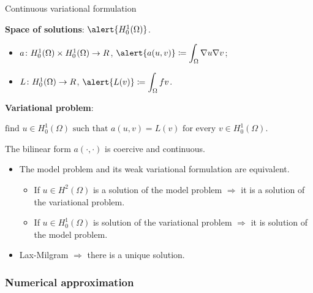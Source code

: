 \begin{frame}[allowframebreaks]{Continuous variational formulation}

\textbf{Space of solutions}: $\alert{H_0^1(\Omega)}$.
\begin{itemize}\itemsep1em
	\item $a\colon H^1_0(\Omega)\times H_0^1(\Omega)\to\relax R$, $\displaystyle \alert{a(u,v)}\coloneqq\int_\Omega\nabla u\nabla v$;
	\item $L\colon H_0^1(\Omega)\to\relax R$, $\displaystyle \alert{L(v)}\coloneqq\int_\Omega f v$.
\end{itemize}
\textbf{Variational problem}:
\begin{block}{}
	\begin{center}
	$\text{find } u\in H^1_0(\Omega) \text{ such that } a(u,v)=L(v)\text{ for every } v\in H_0^1(\Omega)$.
	\end{center}
\end{block}
\framebreak
\begin{theorem}
	The bilinear form $a(\cdot,\cdot)$ is coercive and continuous.
\end{theorem}

\begin{itemize}\itemsep1em
	\item The model problem and its weak variational formulation are \alert{equivalent}.
	\begin{itemize}\itemsep1em
		\item If $u\in H^2(\Omega)$ is a solution of the model problem $\Rightarrow$ it is a solution of the variational problem.
		\item If $u\in H_0^1(\Omega)$ is solution of the variational problem $\Rightarrow$ it is solution of the model problem.
	\end{itemize}
	\item \alert{Lax-Milgram} $\Rightarrow$ there is a unique solution.
\end{itemize}

\end{frame}

\subsubsection{Numerical approximation}

